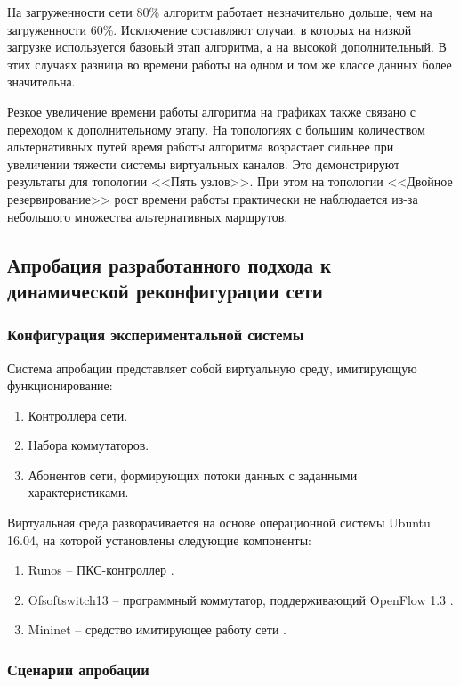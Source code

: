 \documentclass[12pt, a4paper]{article}
\begin{document}
На загруженности сети 80\% алгоритм работает незначительно дольше, чем на загруженности 60\%. Исключение составляют случаи, в которых на низкой загрузке используется базовый этап алгоритма, а на высокой дополнительный. В этих случаях разница во времени работы на одном и том же классе данных более значительна.

Резкое увеличение времени работы алгоритма на графиках также связано с переходом к дополнительному этапу. На топологиях с большим количеством альтернативных путей время работы алгоритма возрастает сильнее при увеличении тяжести системы виртуальных каналов. Это демонстрируют результаты для топологии <<Пять узлов>>. При этом на топологии <<Двойное резервирование>> рост времени работы практически не наблюдается из-за небольшого множества альтернативных маршрутов.

\FloatBarrier

\subsection{Апробация разработанного подхода к динамической реконфигурации сети} \label{subsec:approbation}
\subsubsection{Конфигурация экспериментальной системы}
Система апробации представляет собой виртуальную среду, имитирующую
функционирование:
\begin{enumerate}
	\item Контроллера сети.
	\item Набора коммутаторов.
	\item Абонентов сети, формирующих потоки данных с заданными характеристиками.
\end{enumerate}

Виртуальная среда разворачивается на основе операционной системы Ubuntu 16.04,
на которой установлены следующие компоненты:
\begin{enumerate}
	\item Runos -- ПКС-контроллер \cite{runos}.
	\item Ofsoftswitch13 -- программный коммутатор, поддерживающий OpenFlow 1.3 \cite{ofsoftswitch}.
	\item Mininet -- средство имитирующее работу сети \cite{mininet}.
\end{enumerate}

\subsubsection{Сценарии апробации}
\end{document}
